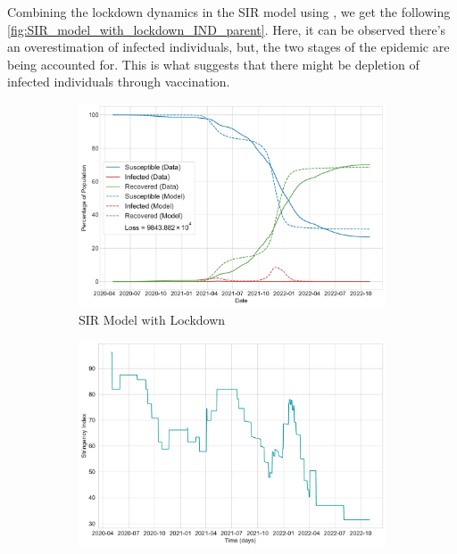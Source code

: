 \documentclass[tikz,fleqn,12pt]{wlscirep}
\begin{document}
Combining the lockdown dynamics in the SIR model using , we get the following \cref{fig:SIR_model_with_lockdown_IND_parent}. Here, it can be observed there's an overestimation of infected individuals, but, the two stages of the epidemic are being accounted for. This is what suggests that there might be depletion of infected individuals through vaccination.

\begin{figure}[htbp!]
  \centering
  \begin{subfigure}[t]{\textwidth}
    \centering
    \includegraphics[scale=0.35]{images/SIR_model_with_lockdown_IND.pdf}
    \caption{SIR Model with Lockdown}
    \label{fig:SIR_model_with_lockdown_IND}
  \end{subfigure}
  \begin{subfigure}[t]{\textwidth}
    \centering
    \includegraphics[scale=0.35]{images/stringency_varying_with_time_IND.pdf}

\end{subfigure}
\end{figure}
\end{document}
